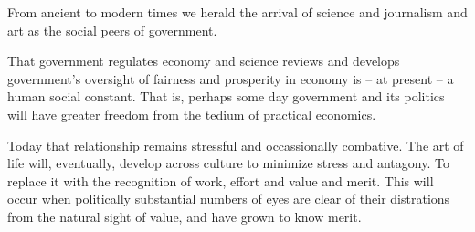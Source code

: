 

From ancient to modern times we herald the arrival of science and
journalism and art as the social peers of government. 

That government regulates economy and science reviews and develops
government's oversight of fairness and prosperity in economy is -- at
present -- a human social constant.  That is, perhaps some day
government and its politics will have greater freedom from the tedium
of practical economics.

Today that relationship remains stressful and occassionally combative.
The art of life will, eventually, develop across culture to minimize
stress and antagony.  To replace it with the recognition of work,
effort and value and merit.  This will occur when politically
substantial numbers of eyes are clear of their distrations from the
natural sight of value, and have grown to know merit.

\bye
